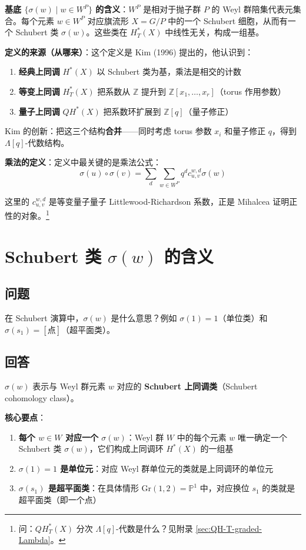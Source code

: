 \textbf{基底 $\{\sigma(w) \mid w \in W^P\}$ 的含义}：$W^P$ 是相对于抛子群 $P$ 的 Weyl 群陪集代表元集合。每个元素 $w \in W^P$ 对应旗流形 $X = G/P$ 中的一个 Schubert 细胞，从而有一个 Schubert 类 $\sigma(w)$。这些类在 $H_T^*(X)$ 中线性无关，构成一组基。

\textbf{定义的来源（从哪来）}：这个定义是 Kim (1996) 提出的，他认识到：
\begin{enumerate}
\item \textbf{经典上同调} $H^*(X)$ 以 Schubert 类为基，乘法是相交的计数
\item \textbf{等变上同调} $H_T^*(X)$ 把系数从 $\mathbb{Z}$ 提升到 $\mathbb{Z}[x_1,\ldots,x_r]$（torus 作用参数）
\item \textbf{量子上同调} $QH^*(X)$ 把系数环扩展到 $\mathbb{Z}[q]$（量子修正）
\end{enumerate}

Kim 的创新：把这三个结构\textbf{合并}——同时考虑 torus 参数 $x_i$ 和量子修正 $q$，得到 $\Lambda[q]$-代数结构。

\textbf{乘法的定义}：定义中最关键的是乘法公式：
$$\sigma(u) \circ \sigma(v) = \sum_{d} \sum_{w \in W^P} q^d c_{u,v}^{w,d} \sigma(w)$$

这里的 $c_{u,v}^{w,d}$ 是等变量子量子 Littlewood-Richardson 系数，正是 Mihalcea 证明正性的对象。\footnote{问：$QH_T^*(X)$ 分次 $\Lambda[q]$-代数是什么？见附录 \cref{sec:QH-T-graded-Lambda}。}
\section{Schubert 类 $\sigma(w)$ 的含义}\label{sec:SchubertClassSigma}
\subsection{问题}
在 Schubert 演算中，$\sigma(w)$ 是什么意思？例如 $\sigma(1) = 1$（单位类）和 $\sigma(s_1) = [\text{点}]$（超平面类）。
\subsection{回答}
$\sigma(w)$ 表示与 Weyl 群元素 $w$ 对应的 \textbf{Schubert 上同调类}（Schubert cohomology class）。

\textbf{核心要点}：
\begin{enumerate}
\item \textbf{每个 $w \in W$ 对应一个 $\sigma(w)$}：Weyl 群 $W$ 中的每个元素 $w$ 唯一确定一个 Schubert 类 $\sigma(w)$，它们构成上同调环 $H^*(X)$ 的一组基
\item \textbf{$\sigma(1) = 1$ 是单位元}：对应 Weyl 群单位元的类就是上同调环的单位元
\item \textbf{$\sigma(s_1)$ 是超平面类}：在具体情形 $\mathrm{Gr}(1, 2) = \mathbb{P}^1$ 中，对应换位 $s_1$ 的类就是超平面类（即一个点）
\end{enumerate}

